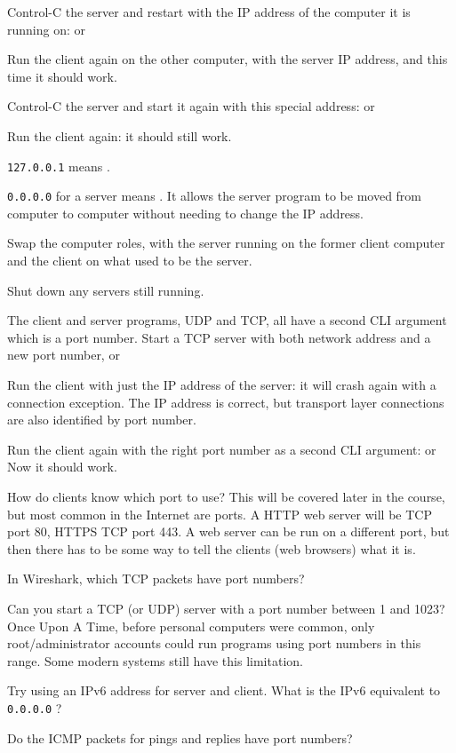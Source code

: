 \STEP Control-C the server and restart with the IP address of the computer it is running on:
or

Run the client again on the other computer, with the server IP address, and this time
it should work.

\STEP Control-C the server and start it again with this special address:
or

Run the client again: it should still work.

\begin{IMPORTANT}
\texttt{127.0.0.1} means .

\texttt{0.0.0.0} for a server means . It allows
the server program to be moved from computer to computer without needing to change the
IP address.
\end{IMPORTANT}

\STEP Swap the computer roles, with the server running on the former client computer and
the client on what used to be the server.



Shut down any servers still running.

\STEP The client and server programs, UDP and TCP, all have a second CLI argument which
is a port number. Start a TCP server with both network address and a new port number,
or

Run the client with just the IP address of the server: it will crash again with a
connection exception. The IP address is correct, but transport layer
connections are also identified by port number.

Run the client again with the right port number as a second CLI argument:
or
Now it should work.

How do clients know which port to use? This will be covered later in the course,
but most common in the Internet are  ports. A HTTP web server
will be TCP port 80, HTTPS TCP port 443.
A web server can be run on a different port, but then there has to be some way to
tell the clients (web browsers) what it is.

In Wireshark, which TCP packets have port numbers?



Can you start a TCP (or UDP) server with a port number between 1 and 1023?
Once Upon A Time, before personal computers were common, only root/administrator accounts
could run programs using port numbers in this range. Some modern systems still have this
limitation.

Try using an IPv6 address for server and client. What is the IPv6 equivalent
to \texttt{0.0.0.0} ?

Do the ICMP packets for pings and replies have port numbers?

\COPYRIGHT


